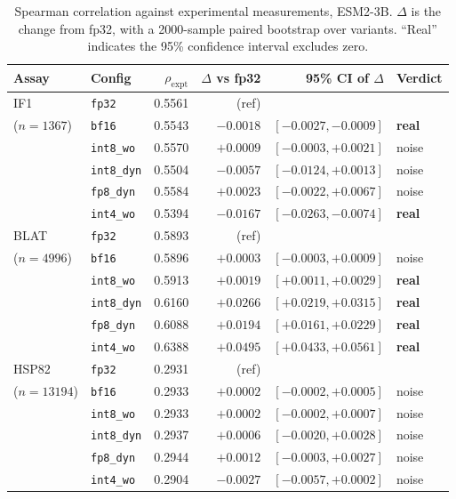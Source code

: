 \documentclass[11pt]{article}
\newcommand{\cfg}[1]{\texttt{#1}}
\begin{document}
\begin{table}[htb]
\centering
\caption{Spearman correlation against experimental measurements, ESM2-3B.
$\Delta$ is the change from fp32, with a 2000-sample paired bootstrap over
variants. ``Real'' indicates the 95\% confidence interval excludes zero.}
\small
\begin{tabular}{llrrrl}
\toprule
Assay & Config & $\rho_{\text{expt}}$ & $\Delta$ vs fp32 & 95\% CI of $\Delta$ & Verdict \\
\midrule
IF1        & \cfg{fp32}      & 0.5561 & (ref)    &                      &  \\
($n{=}1367$)& \cfg{bf16}      & 0.5543 & $-0.0018$ & $[-0.0027, -0.0009]$ & \textbf{real} \\
           & \cfg{int8\_wo}  & 0.5570 & $+0.0009$ & $[-0.0003, +0.0021]$ & noise \\
           & \cfg{int8\_dyn} & 0.5504 & $-0.0057$ & $[-0.0124, +0.0013]$ & noise \\
           & \cfg{fp8\_dyn}  & 0.5584 & $+0.0023$ & $[-0.0022, +0.0067]$ & noise \\
           & \cfg{int4\_wo}  & 0.5394 & $\mathbf{-0.0167}$ & $[-0.0263, -0.0074]$ & \textbf{real} \\
\midrule
BLAT       & \cfg{fp32}      & 0.5893 & (ref)    &                      &  \\
($n{=}4996$)& \cfg{bf16}      & 0.5896 & $+0.0003$ & $[-0.0003, +0.0009]$ & noise \\
           & \cfg{int8\_wo}  & 0.5913 & $+0.0019$ & $[+0.0011, +0.0029]$ & \textbf{real} \\
           & \cfg{int8\_dyn} & 0.6160 & $\mathbf{+0.0266}$ & $[+0.0219, +0.0315]$ & \textbf{real} \\
           & \cfg{fp8\_dyn}  & 0.6088 & $\mathbf{+0.0194}$ & $[+0.0161, +0.0229]$ & \textbf{real} \\
           & \cfg{int4\_wo}  & 0.6388 & $\mathbf{+0.0495}$ & $[+0.0433, +0.0561]$ & \textbf{real} \\
\midrule
HSP82      & \cfg{fp32}      & 0.2931 & (ref)    &                      &  \\
($n{=}13194$)& \cfg{bf16}    & 0.2933 & $+0.0002$ & $[-0.0002, +0.0005]$ & noise \\
           & \cfg{int8\_wo}  & 0.2933 & $+0.0002$ & $[-0.0002, +0.0007]$ & noise \\
           & \cfg{int8\_dyn} & 0.2937 & $+0.0006$ & $[-0.0020, +0.0028]$ & noise \\
           & \cfg{fp8\_dyn}  & 0.2944 & $+0.0012$ & $[-0.0003, +0.0027]$ & noise \\
           & \cfg{int4\_wo}  & 0.2904 & $-0.0027$ & $[-0.0057, +0.0002]$ & noise \\
\bottomrule
\end{tabular}
\end{table}
\end{document}
